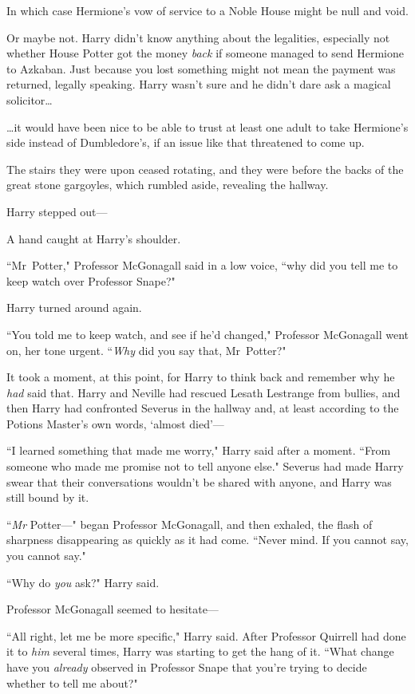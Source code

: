 In which case Hermione's vow of service to a Noble House might be null and void.

Or maybe not. Harry didn't know anything about the legalities, especially not whether House Potter got the money \emph{back} if someone managed to send Hermione to Azkaban. Just because you lost something might not mean the payment was returned, legally speaking. Harry wasn't sure and he didn't dare ask a magical solicitor{\ldots}

{\ldots}it would have been nice to be able to trust at least one adult to take Hermione's side instead of Dumbledore's, if an issue like that threatened to come up.

The stairs they were upon ceased rotating, and they were before the backs of the great stone gargoyles, which rumbled aside, revealing the hallway.

Harry stepped out—

A hand caught at Harry's shoulder.

``Mr~Potter," Professor McGonagall said in a low voice, ``why did you tell me to keep watch over Professor Snape?"

Harry turned around again.

``You told me to keep watch, and see if he'd changed," Professor McGonagall went on, her tone urgent. ``\emph{Why} did you say that, Mr~Potter?"

It took a moment, at this point, for Harry to think back and remember why he \emph{had} said that. Harry and Neville had rescued Lesath Lestrange from bullies, and then Harry had confronted Severus in the hallway and, at least according to the Potions Master's own words, `almost died'—

``I learned something that made me worry," Harry said after a moment. ``From someone who made me promise not to tell anyone else." Severus had made Harry swear that their conversations wouldn't be shared with anyone, and Harry was still bound by it.

``\emph{Mr} Potter—" began Professor McGonagall, and then exhaled, the flash of sharpness disappearing as quickly as it had come. ``Never mind. If you cannot say, you cannot say."

``Why do \emph{you} ask?" Harry said.

Professor McGonagall seemed to hesitate—

``All right, let me be more specific," Harry said. After Professor Quirrell had done it to \emph{him} several times, Harry was starting to get the hang of it. ``What change have you \emph{already} observed in Professor Snape that you're trying to decide whether to tell me about?"

